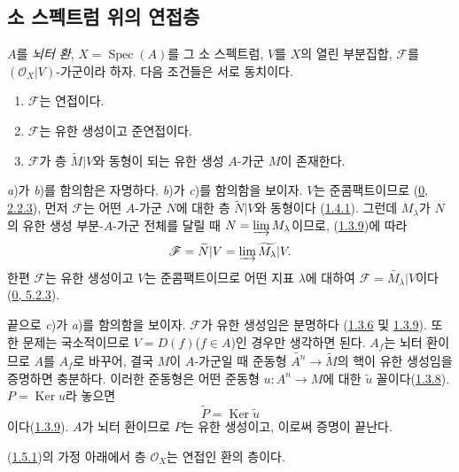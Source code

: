 \subsection{소 스펙트럼 위의 연접층}
\label{subsection:I.1.5-ko}

\begin{theorem}[1.5.1]
\label{I.1.5.1-ko}
$A$를 \emph{뇌터 환}, $X=\operatorname{Spec}(A)$를 그 소 스펙트럼,
$V$를 $X$의 열린 부분집합, $\mathscr{F}$를
$(\mathscr{O}_X|V)$-가군이라 하자. 다음 조건들은 서로 동치이다.
\begin{enumerate}
  \item[\textit{a})] $\mathscr{F}$는 연접이다.
  \item[\textit{b})] $\mathscr{F}$는 유한 생성이고 준연접이다.
  \item[\textit{c})] $\mathscr{F}$가 층 $\widetilde{M}|V$와 동형이
  되는 유한 생성 $A$-가군 $M$이 존재한다.
\end{enumerate}
\end{theorem}

\textit{a})가 \textit{b})를 함의함은 자명하다. \textit{b})가
\textit{c})를 함의함을 보이자. $V$는 준콤팩트이므로
(\hyperref[0.2.2.3-ko]{0, 2.2.3}), 먼저 $\mathscr{F}$는 어떤
$A$-가군 $N$에 대한 층 $\widetilde{N}|V$와 동형이다
(\hyperref[I.1.4.1-ko]{1.4.1}). 그런데 $M_\lambda$가 $N$의 유한 생성
부분-$A$-가군 전체를 달릴 때
$N=\varinjlim M_\lambda$이므로, (\hyperref[I.1.3.9-ko]{1.3.9})에 따라
\[
  \mathscr{F}=\widetilde{N}|V
  =\varinjlim\widetilde{M_\lambda}|V.
\]
한편 $\mathscr{F}$는 유한 생성이고 $V$는 준콤팩트이므로 어떤 지표
$\lambda$에 대하여
$\mathscr{F}=\widetilde{M_\lambda}|V$이다
(\hyperref[0.5.2.3-ko]{0, 5.2.3}).

끝으로 \textit{c})가 \textit{a})를 함의함을 보이자.
$\mathscr{F}$가 유한 생성임은 분명하다
(\hyperref[I.1.3.6-ko]{1.3.6} 및
\hyperref[I.1.3.9-ko]{1.3.9}). 또한 문제는 국소적이므로
$V=D(f)$($f\in A$)인 경우만 생각하면 된다. $A_f$는 뇌터 환이므로
$A$를 $A_f$로 바꾸어, 결국 $M$이 $A$-가군일 때 준동형
$\widetilde{A^n}\to\widetilde{M}$의 핵이 유한 생성임을 증명하면
충분하다. 이러한 준동형은 어떤 준동형 $u:A^n\to M$에 대한
$\widetilde{u}$ 꼴이다(\hyperref[I.1.3.8-ko]{1.3.8}).
$P=\operatorname{Ker}u$라 놓으면
\[
  \widetilde{P}=\operatorname{Ker}\widetilde{u}
\]
이다(\hyperref[I.1.3.9-ko]{1.3.9}). $A$가 뇌터 환이므로 $P$는
유한 생성이고, 이로써 증명이 끝난다.

\begin{corollary}[1.5.2]
\label{I.1.5.2-ko}
(\hyperref[I.1.5.1-ko]{1.5.1})의 가정 아래에서 층
$\mathscr{O}_X$는 연접인 환의 층이다.
\end{corollary}

